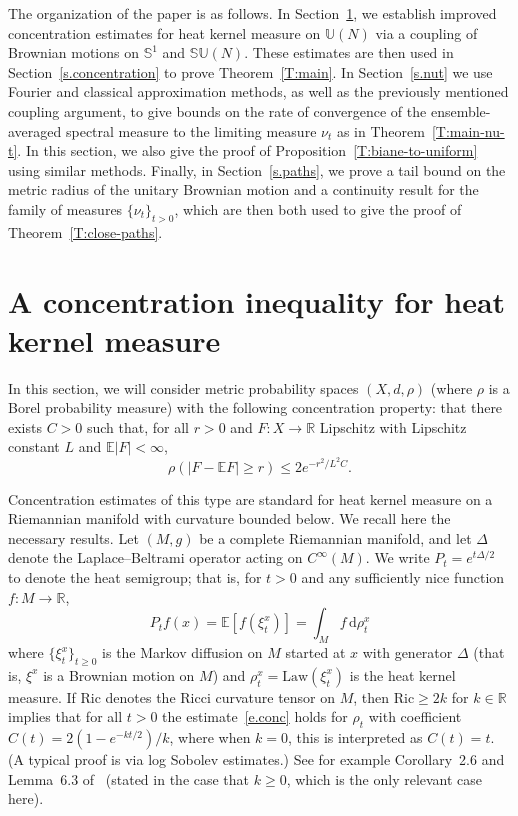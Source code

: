 \documentclass[11pt]{article}
\theoremstyle{definition}
\numberwithin{equation}{section}
\numberwithin{figure}{section}
\numberwithin{table}{section}
\newcommand*{\dd}{\mathrm{d}}
\newcommand*{\drho}{\dd \rho}
\begin{document}
The organization of the paper is as follows. In Section~\ref{s.lsi}, we establish improved concentration estimates for heat kernel measure on $\mathbb{U}(N)$ via a coupling of Brownian motions on $\mathbb{S}^1$ and $\mathbb{SU}(N)$. These estimates are then used in Section~\ref{s.concentration} to prove Theorem~\ref{T:main}. In Section~\ref{s.nut} we use Fourier and classical approximation methods, as well as the previously mentioned coupling argument, to give bounds on the rate of convergence of the ensemble-averaged spectral measure to the limiting measure $\nu_t$ as in Theorem~\ref{T:main-nu-t}. In this section, we also give the proof of Proposition~\ref{T:biane-to-uniform} using similar methods. Finally, in Section~\ref{s.paths}, we prove a tail bound on the metric radius of the unitary Brownian motion and a continuity result for the family of measures $\{\nu_t\}_{t>0}$, which are then both used to give the proof of Theorem~\ref{T:close-paths}.


\section{A concentration inequality for heat kernel measure}\label{s.lsi}

In this section, we will consider metric probability spaces $(X,d,\rho)$ (where $\rho$ is a Borel probability measure) with the following concentration property: that there exists $C>0$ such that, for all $r>0$ and $F:X\rightarrow \mathbb{R}$ Lipschitz with Lipschitz constant $L$ and $\mathbb{E}|F|<\infty$,
\begin{equation}\label{e.conc}
\rho\left(\left|F-\mathbb{E}F\right|\ge r\right) \le 2e^{-r^2/L^2C}.
\end{equation}

Concentration estimates of this type are standard for heat kernel measure on a Riemannian manifold with curvature bounded below. We recall here the necessary results. Let $(M,g)$ be a complete Riemannian manifold, and let $\Delta$ denote the Laplace--Beltrami operator acting on $C^{\infty}(M)$. We write $P_t=e^{t\Delta/2}$ to denote the heat semigroup; that is, for $t>0$ and any sufficiently nice function $f:M\rightarrow\mathbb{R}$,
\[
P_tf(x) = \mathbb{E}[f(\xi^x_t)] = \int_M f\,\drho^x_t
\]
where $\{\xi^x_t\}_{t\ge0}$ is the Markov diffusion on $M$ started at $x$ with generator $\Delta$ (that is, $\xi^x$ is a Brownian motion on $M$) and $\rho^x_t=\mathrm{Law}(\xi^x_t)$ is the heat kernel measure. If $\mathrm{Ric}$ denotes the Ricci curvature tensor on $M$, then $\mathrm{Ric}\ge 2k$ for $k\in\mathbb{R}$ implies that for all $t>0$ the estimate~\eqref{e.conc} holds for $\rho_t$ with coefficient $C(t)=2(1-e^{-kt/2})/k$, where when $k=0$, this is interpreted as $C(t)=t$. (A typical proof is via log Sobolev estimates.) See for example Corollary~2.6 and Lemma~6.3 of~\cite{Ledoux1999} (stated in the case that $k\ge0$, which is the only relevant case here).
\end{document}
